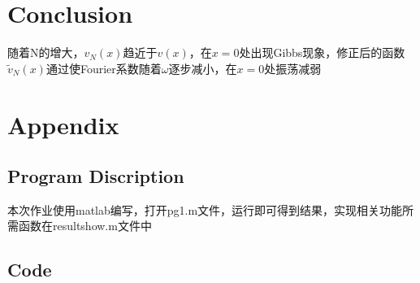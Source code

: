 \documentclass{article}
\begin{document}
\section{Conclusion}

随着N的增大，$v_N(x)$趋近于$v(x)$，在$x=0$处出现Gibbs现象，修正后的函数$\widetilde{v}_N(x)$通过使Fourier系数随着$\omega$逐步减小，在$x=0$处振荡减弱


\section{Appendix}
\subsection{Program Discription}
本次作业使用matlab编写，打开pg1.m文件，运行即可得到结果，实现相关功能所需函数在resultshow.m文件中


\subsection{Code}


\end{document}
